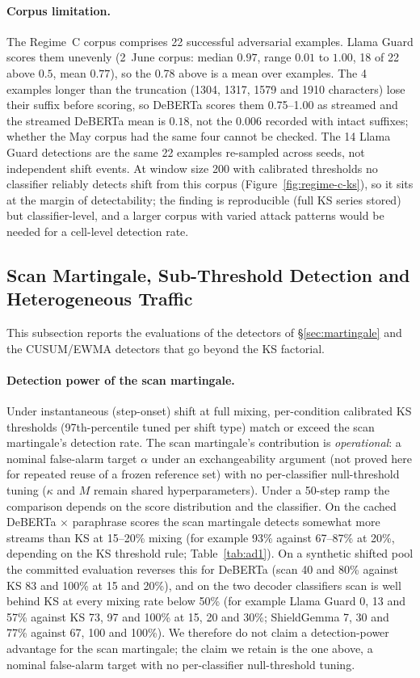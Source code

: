 \documentclass{article}
\begin{document}
\paragraph{Corpus limitation.} The Regime~C corpus comprises 22 successful adversarial examples. Llama Guard scores them unevenly (2~June corpus: median $0.97$, range $0.01$ to $1.00$, 18 of 22 above $0.5$, mean $0.77$), so the 0.78 above is a mean over examples. The 4 examples longer than the truncation (1304, 1317, 1579 and 1910 characters) lose their suffix before scoring, so DeBERTa scores them 0.75--1.00 as streamed and the streamed DeBERTa mean is $0.18$, not the $0.006$ recorded with intact suffixes; whether the May corpus had the same four cannot be checked. The 14 Llama Guard detections are the same 22 examples re-sampled across seeds, not independent shift events. At window size 200 with calibrated thresholds no classifier reliably detects shift from this corpus (Figure~\ref{fig:regime-c-ks}), so it sits at the margin of detectability; the finding is reproducible (full KS series stored) but classifier-level, and a larger corpus with varied attack patterns would be needed for a cell-level detection rate.

\subsection{Scan Martingale, Sub-Threshold Detection and Heterogeneous Traffic}
\label{sec:additional-detectors}

This subsection reports the evaluations of the detectors of \S\ref{sec:martingale} and the CUSUM/EWMA detectors that go beyond the KS factorial.

\paragraph{Detection power of the scan martingale.} Under instantaneous (step-onset) shift at full mixing, per-condition calibrated KS thresholds (97th-percentile tuned per shift type) match or exceed the scan martingale's detection rate. The scan martingale's contribution is \emph{operational}: a nominal false-alarm target $\alpha$ under an exchangeability argument (not proved here for repeated reuse of a frozen reference set) with no per-classifier null-threshold tuning ($\kappa$ and $M$ remain shared hyperparameters). Under a 50-step ramp the comparison depends on the score distribution and the classifier. On the cached DeBERTa $\times$ paraphrase scores the scan martingale detects somewhat more streams than KS at 15--20\% mixing (for example 93\% against 67--87\% at 20\%, depending on the KS threshold rule; Table~\ref{tab:ad1}). On a synthetic shifted pool the committed evaluation reverses this for DeBERTa (scan 40 and 80\% against KS 83 and 100\% at 15 and 20\%), and on the two decoder classifiers scan is well behind KS at every mixing rate below 50\% (for example Llama Guard 0, 13 and 57\% against KS 73, 97 and 100\% at 15, 20 and 30\%; ShieldGemma 7, 30 and 77\% against 67, 100 and 100\%). We therefore do not claim a detection-power advantage for the scan martingale; the claim we retain is the one above, a nominal false-alarm target with no per-classifier null-threshold tuning.
\end{document}
